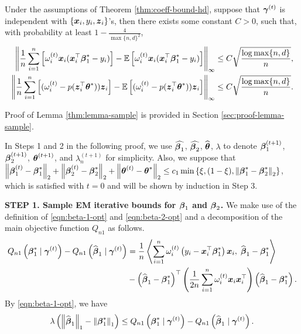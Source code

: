 \begin{lemma}  \label{thm:lemma-sample}
Under the assumptions of Theorem \ref{thm:coeff-bound-hd}, suppose that $\boldsymbol{\gamma}^{(t)}$ is independent with $\{\boldsymbol{x}_i, y_i, \boldsymbol{z}_i\}$'s, then there exists some constant $C > 0$, such that, with probability at least $1 - \frac{4}{\max\{n, d\}^2}$,  
\begin{align*}
\left\lVert \frac{1}{n}\sum_{i=1}^n \left[\omega_i^{(t)} \boldsymbol{x}_i ( \boldsymbol{x}_i^\top \boldsymbol{\beta}_1^* - y_i) \right] 
    - \mathbb{E}\left[ \omega_i^{(t)} \boldsymbol{x}_i ( \boldsymbol{x}_i^\top \boldsymbol{\beta}_1^* - y_i) \right] \right\rVert_\infty 
& \le  C \sqrt{ \frac{\log \max\{n, d\}}{n} },  \\
\left\lVert  \frac{1}{n}\sum_{i=1}^n \left[( \omega_i^{(t)} - p(\boldsymbol{z}_i^\top\boldsymbol{\theta}^{*}) ) \boldsymbol{z}_i \right]
    - \mathbb{E}\left[ (\omega_i^{(t)} - p(\boldsymbol{z}_i^\top\boldsymbol{\theta}^{*}) ) \boldsymbol{z}_i \right] \right\rVert_\infty
& \le C \sqrt{ \frac{\log \max\{n, d\}}{n} }.
\end{align*}
\end{lemma}
\noindent Proof of Lemma \ref{thm:lemma-sample} is provided in Section \ref{sec:proof-lemma-sample}. 

\medskip

\noindent In Steps 1 and 2 in the following proof, we use $\widehat{\boldsymbol{\beta}_1}$, $\widehat{\boldsymbol{\beta}_2}$, $\widehat{\boldsymbol{\theta}}$, $\lambda$ to denote $\boldsymbol{\beta}_1^{(t+1)}$, $\boldsymbol{\beta}_2^{(t+1)}$,  $\boldsymbol{\theta}^{(t+1)}$, and $\lambda_n^{(t+1)}$ for simplicity. Also, we suppose that $\left\lVert\boldsymbol{\beta}_1^{(t)} - \boldsymbol{\beta}_1^*\right\rVert_2 + \left\lVert\boldsymbol{\beta}_2^{(t)} - \boldsymbol{\beta}_2^*\right\rVert_2 + \left\lVert\boldsymbol{\theta}^{(t)} - \boldsymbol{\theta}^*\right\rVert_2 \le c_1 \min\left\{ \xi, (1-\xi), \left\lVert\boldsymbol{\beta}_1^*-\boldsymbol{\beta}_2^*\right\rVert_2 \right\}$, which is satisfied with $t=0$ and will be shown by induction in Step 3.

\noindent
\textbf{STEP 1. Sample EM iterative bounds for $\boldsymbol{\beta}_1$ and $\boldsymbol{\beta}_2$.} We make use of the definition of \eqref{eqn:beta-1-opt} and \eqref{eqn:beta-2-opt} and a decomposition of the main objective function $Q_{n1}$ as follows.
\begin{align}
Q_{n1}\left( {\boldsymbol{\beta}_1^*} \;|\; \boldsymbol{\gamma}^{(t)} \right) - Q_{n1}\left( \widehat{\boldsymbol{\beta}}_1 \;|\; \boldsymbol{\gamma}^{(t)} \right)
& = \frac{1}{n}\left\langle \sum_{i=1}^{n}\omega_i^{(t)}\left( y_i-\boldsymbol{x}_i^\top\boldsymbol{\beta}_1^* \right) \boldsymbol{x}_i,\; \widehat{\boldsymbol{\beta}}_1-\boldsymbol{\beta}_1^* \right\rangle \nonumber\\
& - \left( \widehat{\boldsymbol{\beta}}_1-\boldsymbol{\beta}_1^* \right)^\top 
\left( \frac{1}{2n}\sum_{i=1}^n\omega_i^{(t)}\boldsymbol{x}_i\boldsymbol{x}_i^\top \right)
\left( \widehat{\boldsymbol{\beta}}_1-\boldsymbol{\beta}_1^* \right). \label{eqn:Qn-decomp}
\end{align}
By \eqref{eqn:beta-1-opt}, we have
\begin{equation} \label{eqn:Qn-diff-lb-1}
\lambda\left( \left\lVert\widehat{\boldsymbol{\beta}}_1\right\rVert_1-\left\lVert\boldsymbol{\beta}_1^*\right\rVert_1 \right) 
\le Q_{n1}\left( {\boldsymbol{\beta}_1^*} \;|\; \boldsymbol{\gamma}^{(t)} \right) - Q_{n1}\left( \widehat{\boldsymbol{\beta}}_1 \;|\; \boldsymbol{\gamma}^{(t)} \right).
\end{equation}

